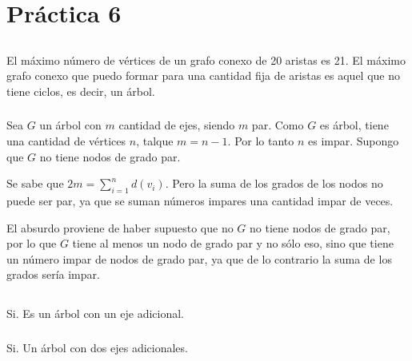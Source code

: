 \section{Práctica 6}

\subsection{}

\subsubsection{}
El máximo número de vértices de un grafo conexo de 20 aristas es 21. El máximo grafo conexo que puedo formar para una cantidad fija de aristas es aquel que no tiene ciclos, es decir, un árbol.

\subsubsection{}
Sea $G$ un árbol con $m$ cantidad de ejes, siendo $m$ par. Como $G$ es árbol, tiene una cantidad de vértices $n$, talque $m = n - 1$. Por lo tanto $n$ es impar. Supongo que $G$ no tiene nodos de grado par. 

Se sabe que $2m = \sum_{i = 1}^{n}d(v_i)$. Pero la suma de los grados de los nodos no puede ser par, ya que se suman números impares una cantidad impar de veces. 

El absurdo proviene de haber supuesto que no $G$ no tiene nodos de grado par, por lo que $G$ tiene al menos un nodo de grado par y no sólo eso, sino que tiene un número impar de nodos de grado par, ya que de lo contrario la suma de los grados sería impar.

\subsection{}

\setcounter{subsubsection}{1}
\subsubsection{}

Si. Es un árbol con un eje adicional.

\subsubsection{}

Si. Un árbol con dos ejes adicionales.

